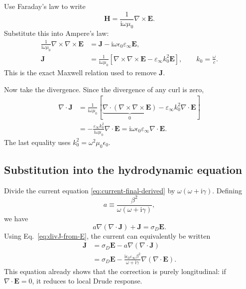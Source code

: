 \documentclass[11pt,a4paper]{article}
\newcommand{\E}{\mathbf E}
\newcommand{\Hfield}{\mathbf H}
\newcommand{\J}{\mathbf J}
\newcommand{\ii}{\mathrm i}
\newcommand{\epsinf}{\varepsilon_\infty}
\begin{document}
Use Faraday's law to write
\begin{equation}
    \Hfield=\frac{1}{\ii\omega\mu_0}\nabla\!\times\!\E.
    \label{eq:H-from-E}
\end{equation}
Substitute this into Ampere's law:
\begin{align}
    \frac{1}{\ii\omega\mu_0}
    \nabla\!\times\!\nabla\!\times\!\E
    &=\J-\ii\omega\epsilon_0\epsinf\E,\\
    \J
    &=\frac{1}{\ii\omega\mu_0}
      \left[
        \nabla\!\times\!\nabla\!\times\!\E
        -\epsinf k_0^2\E
      \right],
    \qquad
    k_0=\frac{\omega}{c}.
    \label{eq:J-from-E}
\end{align}
This is the exact Maxwell relation used to remove \(\J\).

Now take the divergence.  Since the divergence of any curl is zero,
\begin{align}
    \nabla\!\cdot\!\J
    &=\frac{1}{\ii\omega\mu_0}
      \left[
        \underbrace{\nabla\!\cdot\!
        (\nabla\!\times\!\nabla\!\times\!\E)}_{0}
        -\epsinf k_0^2\nabla\!\cdot\!\E
      \right]\\
    &=-\frac{\epsinf k_0^2}{\ii\omega\mu_0}
      \nabla\!\cdot\!\E
     =\ii\omega\epsilon_0\epsinf
      \nabla\!\cdot\!\E.
    \label{eq:divJ-from-E}
\end{align}
The last equality uses \(k_0^2=\omega^2\mu_0\epsilon_0\).

\subsection{Substitution into the hydrodynamic equation}

Divide the current equation \eqref{eq:current-final-derived} by
\(\omega(\omega+\ii\gamma)\).  Defining
\begin{equation}
    a\equiv\frac{\beta^2}{\omega(\omega+\ii\gamma)},
    \label{eq:a-definition}
\end{equation}
we have
\begin{equation}
    a\nabla(\nabla\!\cdot\!\J)+\J=\sigma_D\E.
    \label{eq:current-a-form}
\end{equation}
Using Eq.~\eqref{eq:divJ-from-E}, the current can equivalently be written
\begin{align}
    \J
    &=\sigma_D\E-a\nabla(\nabla\!\cdot\!\J)\\
    &=\sigma_D\E
      -\frac{\ii\epsilon_0\epsinf\beta^2}{\omega+\ii\gamma}
       \nabla(\nabla\!\cdot\!\E).
    \label{eq:J-electric-constitutive}
\end{align}
This equation already shows that the correction is purely longitudinal: if
\(\nabla\!\cdot\!\E=0\), it reduces to local Drude response.
\end{document}
